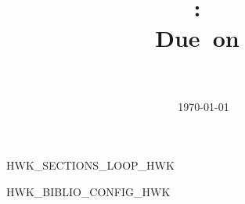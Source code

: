 \documentclass[fleqn,twoside]{article}
\title{
\vspace{2in}
\textmd{\textbf{\hmwkClass:\ \hmwkTitle}}\\
\normalsize\vspace{0.1in}\small{Due\ on\ \hmwkDueDate}\\
\vspace{0.1in}\large{\textit{\hmwkClassInstructor\ \hmwkClassTime}}
\vspace{3in}
}
\author{\textbf{\hmwkAuthorName}}
\date{\today} %
\begin{document}
\maketitle



\newpage



HWK_SECTIONS_LOOP_HWK




HWK_BIBLIO_CONFIG_HWK
\end{document}
